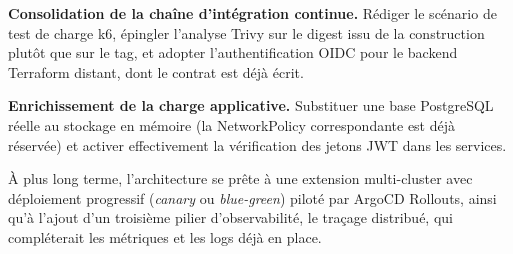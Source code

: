 \documentclass[12pt,a4paper,twoside,openright]{report}
\makeatletter
\def\cleardoublepage{\clearpage\if@twoside
  \ifodd\c@page\else\hbox{}\thispagestyle{empty}\newpage\fi\fi}
\makeatother
\begin{document}
\textbf{Consolidation de la chaîne d'intégration continue.} Rédiger le scénario de
test de charge k6, épingler l'analyse Trivy sur le digest issu de la construction
plutôt que sur le tag, et adopter l'authentification OIDC pour le backend Terraform
distant, dont le contrat est déjà écrit.

\textbf{Enrichissement de la charge applicative.} Substituer une base PostgreSQL réelle
au stockage en mémoire (la NetworkPolicy correspondante est déjà réservée) et
activer effectivement la vérification des jetons JWT dans les services.

À plus long terme, l'architecture se prête à une extension multi-cluster avec
déploiement progressif (\emph{canary} ou \emph{blue-green}) piloté par ArgoCD Rollouts,
ainsi qu'à l'ajout d'un troisième pilier d'observabilité, le traçage distribué, qui
compléterait les métriques et les logs déjà en place.

\cleardoublepage
\end{document}
